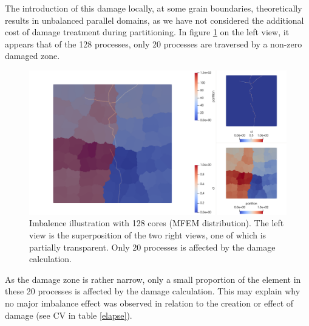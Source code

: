 \documentclass[12pt]{article}
\begin{document}
The introduction of this damage locally, at some grain boundaries, theoretically results in unbalanced parallel domains, as we have not considered the additional cost of damage treatment during partitioning. In figure \ref{imbalence} on the left view, it appears that of the 128 processes, only 20 processes are traversed by a non-zero damaged zone.
\begin{figure}
	\includegraphics[width=1.\textwidth]{imbalance.png}
	\caption{Imbalence illustration with 128 cores (MFEM distribution). The left view is the superposition of the two right views, one of which is partially transparent. Only 20 processes is affected by the damage calculation.\label{imbalence}}
\end{figure}
As the damage zone is rather narrow, only a small proportion of the element in these 20 processes is affected by the damage calculation. This may explain why no major imbalance effect was observed in relation to the creation or effect of damage (see CV in table \ref{elapse}).
\end{document}
